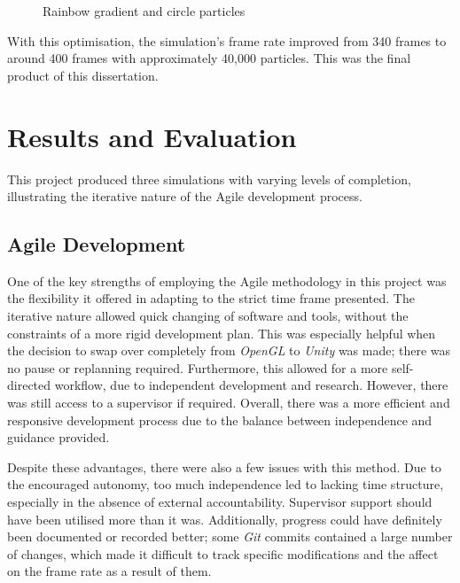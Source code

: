 \documentclass[a4paper, 12pt]{article}
\newcommand{\wideimage}[2][]{%
  \makebox[\textwidth][c]{\texttt{[image: \#2]}}%
}
\begin{document}
    \begin{figure}[H]
        \begin{center}
            \wideimage[width=0.5\textwidth]{finalAppearance.png}
            \caption{Rainbow gradient and circle particles}
        \end{center}
    \end{figure}

    With this optimisation, the simulation's frame rate improved from 340 frames to around 400 frames with approximately 40,000 particles. This was the final product of this dissertation.

    \newpage

    \section{Results and Evaluation}
    \label{sec:resultsandevaluation}

    This project produced three simulations with varying levels of completion, illustrating the iterative nature of the Agile development process.

    \subsection{Agile Development}

    One of the key strengths of employing the Agile methodology in this project was the flexibility it offered in adapting to the strict time frame presented. The iterative nature allowed quick changing of software and tools, without the constraints of a more rigid development plan. This was especially helpful when the decision to swap over completely from \textit{OpenGL} to \textit{Unity} was made; there was no pause or replanning required. Furthermore, this allowed for a more self-directed workflow, due to independent development and research. However, there was still access to a supervisor if required. Overall, there was a more efficient and responsive development process due to the balance between independence and guidance provided.

    Despite these advantages, there were also a few issues with this method. Due to the encouraged autonomy, too much independence led to lacking time structure, especially in the absence of external accountability. Supervisor support should have been utilised more than it was. Additionally, progress could have definitely been documented or recorded better; some \textit{Git} commits contained a large number of changes, which made it difficult to track specific modifications and the affect on the frame rate as a result of them.
\end{document}
